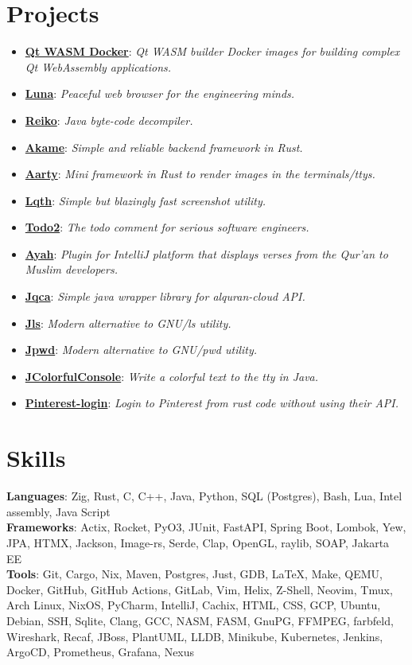 \documentclass[letterpaper,11pt]{article}
\makeatletter
\newcommand{\githosting} {@{GIT_HOST}}
\newcommand{\githostingurl} {https://\githosting}
\newcommand{\resumeProjectHeading}[3]{
    \item{\href{#2}{\textbf{\color{primary}#1}}: \textit{\color{primary}#3} } \\ \vspace{-7pt}
}
\newcommand{\resumeSubHeadingListStart}{\begin{itemize}[leftmargin=0.15in, label={}]}
\newcommand{\resumeSubHeadingListEnd}{\end{itemize}}
\makeatother
\begin{document}
\section{Projects}
    \resumeSubHeadingListStart
      \resumeProjectHeading
        {Qt WASM Docker}{\githostingurl/qt-wasm-builder}{Qt WASM builder Docker images for building complex Qt WebAssembly applications.}
      \resumeProjectHeading
        {Luna}{\githostingurl/luna}{Peaceful web browser for the engineering minds.}
      \resumeProjectHeading
        {Reiko}{\githostingurl/reiko}{Java byte-code decompiler.}
      \resumeProjectHeading
        {Akame}{\githostingurl/akame}{Simple and reliable backend framework in Rust.}
      \resumeProjectHeading
        {Aarty}{\githostingurl/aarty}{Mini framework in Rust to render images in the terminals/ttys.}
      \resumeProjectHeading
        {Lqth}{\githostingurl/lqth}{Simple but blazingly fast screenshot utility.}
      \resumeProjectHeading
        {Todo2}{\githostingurl/todo2}{The todo comment for serious software engineers.}
      \resumeProjectHeading
        {Ayah}{\githostingurl/Ayah-intellij}{Plugin for IntelliJ platform that displays verses from the Qur'an to Muslim developers.}
      \resumeProjectHeading
        {Jqca}{\githostingurl/alquran-cloud-api}{Simple java wrapper library for alquran-cloud API.}
      \resumeProjectHeading
        {Jls}{https://github.com/anas-stuff/jls}{Modern alternative to GNU/ls utility.}
      \resumeProjectHeading
        {Jpwd}{\githostingurl/jpwd}{Modern alternative to GNU/pwd utility.}
      \resumeProjectHeading
        {JColorfulConsole}{\githostingurl/JColorfulConsole}{Write a colorful text to the tty in Java.}
      \resumeProjectHeading
        {Pinterest-login}{\githostingurl/pinterest-login}{Login to Pinterest from rust code without using their API.}
    \resumeSubHeadingListEnd

\section{Skills}
 \begin{itemize}[leftmargin=0.15in, label={}]
    \small{\item{
     \textbf{Languages}{: Zig, Rust, C, C++, Java, Python, SQL (Postgres), Bash, Lua, Intel assembly, Java Script} \\
     \textbf{Frameworks}{: Actix, Rocket, PyO3, JUnit, FastAPI, Spring Boot, Lombok, Yew, JPA, HTMX, Jackson, Image-rs, Serde, Clap, OpenGL, raylib, SOAP, Jakarta EE} \\
     \textbf{Tools}{: Git, Cargo, Nix, Maven, Postgres, Just, GDB, \LaTeX{}, Make, QEMU, Docker,
     GitHub, GitHub Actions, GitLab, Vim, Helix, Z-Shell, Neovim, Tmux, Arch Linux, NixOS,
     PyCharm, IntelliJ, Cachix, HTML, CSS, GCP, Ubuntu, Debian, SSH, Sqlite, Clang, GCC, NASM, FASM,
     GnuPG, FFMPEG, farbfeld, Wireshark, Recaf,
     JBoss, PlantUML, LLDB, Minikube, Kubernetes, Jenkins, ArgoCD, Prometheus, Grafana, Nexus} \\
    }}
 \end{itemize}
\end{document}
